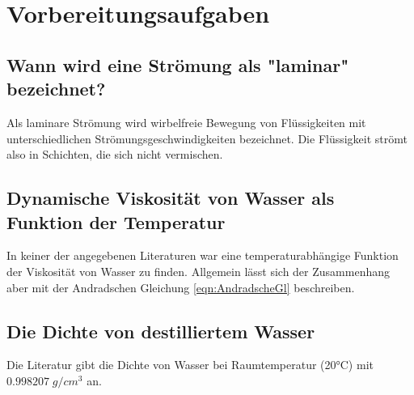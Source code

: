 \section{Vorbereitungsaufgaben}
\label{sec:Vorbereitungsaufgaben}

\subsection{Wann wird eine Strömung als "laminar" bezeichnet?}
    Als laminare Strömung  wird wirbelfreie Bewegung von Flüssigkeiten mit unterschiedlichen Strömungsgeschwindigkeiten bezeichnet. Die Flüssigkeit strömt also in Schichten, die sich nicht vermischen.
    
\subsection{Dynamische Viskosität von Wasser als Funktion der Temperatur}
    In keiner der angegebenen Literaturen war eine temperaturabhängige Funktion der Viskosität von Wasser zu finden. Allgemein lässt sich der Zusammenhang aber mit der Andradschen 
    Gleichung \eqref{eqn:AndradscheGl} beschreiben.

\subsection{Die Dichte von destilliertem Wasser} \label{wasserdichte}
    Die Literatur gibt die Dichte von Wasser bei Raumtemperatur (20°C) mit $0.998207 \;\unit{g/cm^3}$ an.